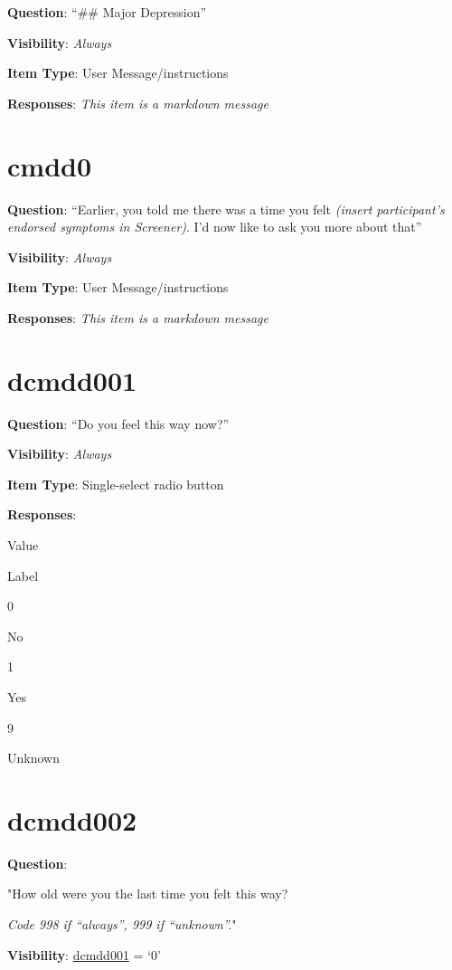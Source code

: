 \documentclass[]{book}
\begin{document}
\textbf{Question}: ``\#\# Major Depression''

\textbf{Visibility}: \emph{Always}

\textbf{Item Type}: User Message/instructions

\textbf{Responses}: \emph{This item is a markdown message}

\hypertarget{cmdd0}{%
\section{cmdd0}\label{cmdd0}}

\textbf{Question}: ``Earlier, you told me there was a time you felt \emph{(insert participant's endorsed symptoms in Screener)}. I'd now like to ask you more about that''

\textbf{Visibility}: \emph{Always}

\textbf{Item Type}: User Message/instructions

\textbf{Responses}: \emph{This item is a markdown message}

\hypertarget{dcmdd001}{%
\section{dcmdd001}\label{dcmdd001}}

\textbf{Question}: ``Do you feel this way now?''

\textbf{Visibility}: \emph{Always}

\textbf{Item Type}: Single-select radio button

\textbf{Responses}:

Value

Label

0

No

1

Yes

9

Unknown

\hypertarget{dcmdd002}{%
\section{dcmdd002}\label{dcmdd002}}

\textbf{Question}:

"How old were you the last time you felt this way?

\emph{Code 998 if ``always'', 999 if ``unknown''.}"

\textbf{Visibility}: \protect\hyperlink{dcmdd001}{dcmdd001} = `0'
\end{document}
